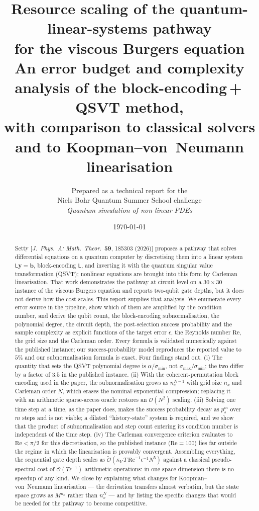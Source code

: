 \documentclass[11pt,a4paper]{article}
\title{\bf Resource scaling of the quantum-linear-systems pathway\\
for the viscous Burgers equation\\[2mm]
\large An error budget and complexity analysis of the
block-encoding\,+\,QSVT method,\\ with comparison to classical solvers
and to Koopman--von~Neumann linearisation}
\author{Prepared as a technical report for the\\
Niels Bohr Quantum Summer School challenge\\
\emph{Quantum simulation of non-linear PDEs}}
\date{\today}
\theoremstyle{plain}
\theoremstyle{definition}
\theoremstyle{remark}
\newcommand{\Rey}{\mathrm{Re}}
\newcommand{\Oh}{\mathcal{O}}
\newcommand{\Ot}{\widetilde{\mathcal{O}}}
\newcommand{\yvec}{\bm{y}}
\newcommand{\Lmat}{\mathsf{L}}
\begin{document}
\maketitle

\begin{abstract}
\noindent
Setty [\emph{J.~Phys.~A: Math.\ Theor.}\ \textbf{59}, 185303 (2026)] proposes a
pathway that solves differential equations on a quantum computer by
discretising them into a linear system $\Lmat\yvec=\bm{b}$, block-encoding
$\Lmat$, and inverting it with the quantum singular value transformation
(QSVT); nonlinear equations are brought into this form by Carleman
linearisation.  That work demonstrates the pathway at circuit level on a
$30\times30$ instance of the viscous Burgers equation and reports two-qubit
gate depths, but it does not derive how the cost scales.  This report supplies
that analysis.  We enumerate every error source in the pipeline, show which of
them are amplified by the condition number, and derive the qubit count, the
block-encoding subnormalisation, the polynomial degree, the circuit depth, the
post-selection success probability and the sample complexity as explicit
functions of the target error $\epsilon$, the Reynolds number $\Rey$, the grid
size and the Carleman order.  Every formula is validated numerically against the
published instance; our success-probability model reproduces the reported value
to $5\%$ and our subnormalisation formula is exact.  Four findings stand out.
(i) The quantity that sets the QSVT polynomial degree is
$\alpha/\sigma_{\min}$, not $\sigma_{\max}/\sigma_{\min}$; the two differ by a
factor of $3.5$ in the published instance.  (ii) With the coherent-permutation
block encoding used in the paper, the subnormalisation grows as
$n_x^{N-1}$ with grid size $n_x$ and Carleman order $N$, which erases the
nominal exponential compression; replacing it with an arithmetic sparse-access
oracle restores an $\Oh(N^2)$ scaling.  (iii) Solving one time step at a time,
as the paper does, makes the success probability decay as $p_s^{m}$ over $m$
steps and is not viable; a dilated ``history-state'' system is required, and we
show that the product of subnormalisation and step count entering its condition
number is independent of the time step.  (iv) The Carleman convergence
criterion evaluates to $\Rey<\pi/2$ for this discretisation, so the published
instance ($\Rey=100$) lies far outside the regime in which the linearisation is
provably convergent.  Assembling everything, the sequential gate depth scales as
$\Ot\!\left(\kappa_V\,T\,\Rey^{-1}\epsilon^{-1}N^5\right)$ against a classical
pseudo-spectral cost of $\Ot(T\epsilon^{-1})$ arithmetic operations: in one
space dimension there is no speedup of any kind.  We close by explaining what
changes for Koopman--von~Neumann linearisation --- the derivation transfers
almost verbatim, but the state space grows as $M^{n_x}$ rather than $n_x^N$ ---
and by listing the specific changes that would be needed for the pathway to
become competitive.
\end{abstract}
\end{document}

